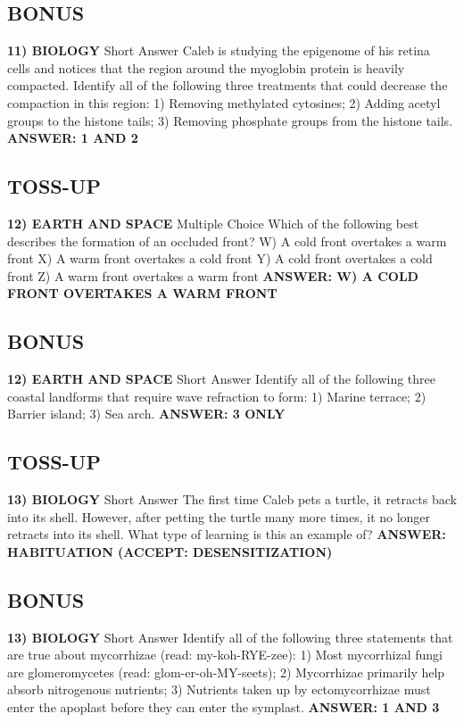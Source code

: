 \documentclass{article}
\begin{document}
\subsection*{BONUS}
\textbf{11) BIOLOGY}
Short Answer Caleb is studying the epigenome of his retina cells and notices that the region around the myoglobin protein is heavily compacted.
Identify all of the following three treatments that could decrease the compaction in this region: 1) Removing methylated cytosines; 2) Adding acetyl groups to the histone tails; 3) Removing phosphate groups from the histone tails.
\textbf{ANSWER: 1 AND 2}

\subsection*{TOSS-UP}
\textbf{12) EARTH AND SPACE}
Multiple Choice Which of the following best describes the formation of an occluded front?
W) A cold front overtakes a warm front
X) A warm front overtakes a cold front
Y) A cold front overtakes a cold front
Z) A warm front overtakes a warm front
\textbf{ANSWER: W) A COLD FRONT OVERTAKES A WARM FRONT}

\subsection*{BONUS}
\textbf{12) EARTH AND SPACE}
Short Answer Identify all of the following three coastal landforms that require wave refraction to form: 1) Marine terrace; 2) Barrier island; 3) Sea arch.
\textbf{ANSWER: 3 ONLY}

\newpage

\subsection*{TOSS-UP}
\textbf{13) BIOLOGY}
Short Answer The first time Caleb pets a turtle, it retracts back into its shell.
However, after petting the turtle many more times, it no longer retracts into its shell.
What type of learning is this an example of?
\textbf{ANSWER: HABITUATION (ACCEPT: DESENSITIZATION)}

\subsection*{BONUS}
\textbf{13) BIOLOGY}
Short Answer Identify all of the following three statements that are true about mycorrhizae (read: my-koh-RYE-zee): 1) Most mycorrhizal fungi are glomeromycetes (read: glom-er-oh-MY-seets); 2) Mycorrhizae primarily help absorb nitrogenous nutrients; 3) Nutrients taken up by ectomycorrhizae must enter the apoplast before they can enter the symplast.
\textbf{ANSWER: 1 AND 3}
\end{document}
